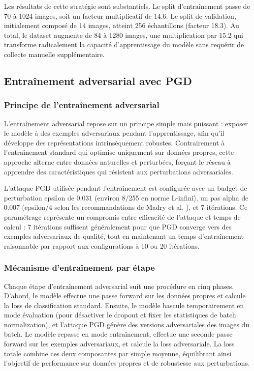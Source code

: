 Les résultats de cette stratégie sont substantiels. Le split d'entraînement passe de 70 à 1024 images, soit un facteur multiplicatif de 14.6. Le split de validation, initialement composé de 14 images, atteint 256 échantillons (facteur 18.3). Au total, le dataset augmente de 84 à 1280 images, une multiplication par 15.2 qui transforme radicalement la capacité d'apprentissage du modèle sans requérir de collecte manuelle supplémentaire.

\subsection{Entraînement adversarial avec PGD}

\subsubsection{Principe de l'entraînement adversarial}

L'entraînement adversarial repose sur un principe simple mais puissant : exposer le modèle à des exemples adversariaux pendant l'apprentissage, afin qu'il développe des représentations intrinsèquement robustes. Contrairement à l'entraînement standard qui optimise uniquement sur données propres, cette approche alterne entre données naturelles et perturbées, forçant le réseau à apprendre des caractéristiques qui résistent aux perturbations adversariales.

L'attaque PGD utilisée pendant l'entraînement est configurée avec un budget de perturbation epsilon de 0.031 (environ 8/255 en norme L-infini), un pas alpha de 0.007 (epsilon/4 selon les recommandations de Madry et al. \cite{madry2018towards}), et 7 itérations. Ce paramétrage représente un compromis entre efficacité de l'attaque et temps de calcul : 7 itérations suffisent généralement pour que PGD converge vers des exemples adversariaux de qualité, tout en maintenant un temps d'entraînement raisonnable par rapport aux configurations à 10 ou 20 itérations.

\subsubsection{Mécanisme d'entraînement par étape}

Chaque étape d'entraînement adversarial suit une procédure en cinq phases. D'abord, le modèle effectue une passe forward sur les données propres et calcule la loss de classification standard. Ensuite, le modèle bascule temporairement en mode évaluation (pour désactiver le dropout et fixer les statistiques de batch normalization), et l'attaque PGD génère des versions adversariales des images du batch. Le modèle repasse en mode entraînement, effectue une seconde passe forward sur les exemples adversariaux, et calcule la loss adversariale. La loss totale combine ces deux composantes par simple moyenne, équilibrant ainsi l'objectif de performance sur données propres et de robustesse aux perturbations.

